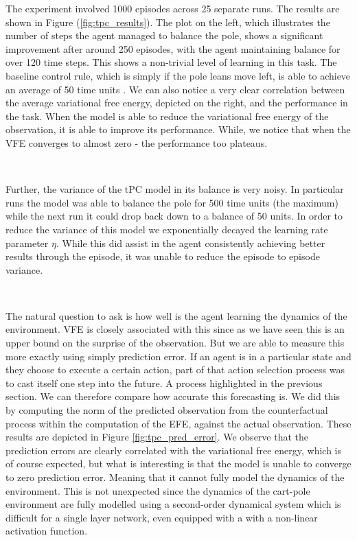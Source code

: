 \documentclass{article}
\newcommand{\refp}[1]{(\ref{#1})}
\begin{document}
The experiment involved 1000 episodes across 25 separate runs. The results are shown in Figure \refp{fig:tpc_results}. The plot on the left, which illustrates the number of steps the agent managed to balance the pole, shows a significant improvement after around 250 episodes, with the agent maintaining balance for over 120 time steps. This shows a non-trivial level of learning in this task. The baseline control rule, which is simply if the pole leans move left, is able to achieve an average of 50 time units \citep{millidge2019combining}. We can also notice a very clear correlation between the average variational free energy, depicted on the right, and the performance in the task. When the model is able to reduce the variational free energy of the observation, it is able to improve its performance. While, we notice that when the VFE converges to almost zero - the performance too plateaus. 

\

Further, the variance of the tPC model in its balance is very noisy. In particular runs the model was able to balance the pole for 500 time units (the maximum) while the next run it could drop back down to a balance of 50 units. In order to reduce the variance of this model we exponentially decayed the learning rate parameter $\eta$. While this did assist in the agent consistently achieving better results through the episode, it was unable to reduce the episode to episode variance. 

\

The natural question to ask is how well is the agent learning the dynamics of the environment. VFE is closely associated with this since as we have seen this is an upper bound on the surprise of the observation. But we are able to measure this more exactly using simply prediction error. If an agent is in a particular state and they choose to execute a certain action, part of that action selection process was to cast itself one step into the future. A process highlighted in the previous section. We can therefore compare how accurate this forecasting is. We did this by computing the norm of the predicted observation from the counterfactual process within the computation of the EFE, against the actual observation. These results are depicted in Figure \ref{fig:tpc_pred_error}. We observe that the prediction errors are clearly correlated with the variational free energy, which is of course expected, but what is interesting is that the model is unable to converge to zero prediction error. Meaning that it cannot fully model the dynamics of the environment. This is not unexpected since the dynamics of the cart-pole environment are fully modelled using a second-order dynamical system \citep{florian2005CorrectEF} which is difficult for a single layer network, even equipped with a with a non-linear activation function. 
\end{document}

